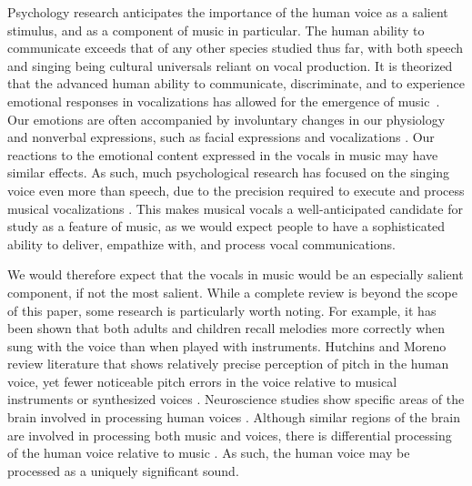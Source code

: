 \documentclass{article}
\begin{document}
Psychology research anticipates the importance of the human voice as a salient stimulus, and as a component of music in particular.
The human ability to communicate exceeds that of any other species studied thus far, with both speech and singing being cultural universals reliant on vocal production.
It is theorized that the advanced human ability to communicate, discriminate, and to experience emotional responses in vocalizations has allowed for the emergence of music~\cite{juslin2003music}.
Our emotions are often accompanied by involuntary changes in our physiology and nonverbal expressions,  such as facial expressions and vocalizations \cite{porges2001polyvagal}.
Our reactions to the emotional content expressed in the vocals in music may have similar effects. As such, much psychological research has focused on the singing voice even more than speech, due to the precision required to execute and process musical vocalizations \cite{hutchins2013linked}.
This makes musical vocals a well-anticipated candidate for study as a feature of music, as we would expect people to have a sophisticated ability to deliver, empathize with, and process vocal communications.

We would therefore expect that the vocals in music would be an especially salient component, if not the most salient. While a complete review is beyond the scope of this paper, some research is particularly worth noting.
For example, it has been shown that both adults \cite{weiss2012something} and children \cite{weiss2015enhanced} recall melodies more correctly when sung with the voice than when played with instruments.
Hutchins and Moreno \cite{hutchins2013linked} review literature that shows relatively precise perception of pitch in the human voice, yet fewer noticeable pitch errors in the voice relative to musical instruments or synthesized voices \cite{hutchins2012frog}.
Neuroscience studies show specific areas of the brain involved in processing human voices \cite{belin2000voice}.
Although similar regions of the brain are involved in processing both music and voices, there is differential processing of the human voice relative to music \cite{armony2015specificity}.
As such, the human voice may be processed as a uniquely significant sound.
\end{document}
